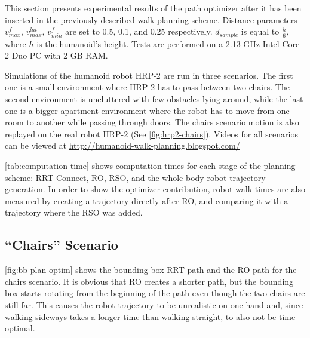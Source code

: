 \noindent This section presents experimental results of the path
optimizer after it has been inserted in the previously described walk
planning scheme. Distance parameters $v_{max}^f$,
$v_{max}^{lat}$, $v_{min}^f$ are set to 0.5, 0.1, and 0.25
respectively. $d_{sample}$ is equal to $\frac{h}{6}$, where $h$
is the humanoid's height.  Tests are performed on a 2.13 GHz Intel Core
2 Duo PC with 2 GB RAM.

Simulations of the humanoid robot HRP-2 are run in three scenarios.
The first one is a small environment where HRP-2 has to pass between
two chairs. The second environment is uncluttered with few obstacles
lying around, while the last one is a bigger apartment environment
where the robot has to move from one room to another while passing
through doors. The chairs scenario motion is also replayed on the real
robot HRP-2 (See \autoref{fig:hrp2-chairs}). Videos for all scenarios
can be viewed at \url{http://humanoid-walk-planning.blogspot.com/}

\autoref{tab:computation-time} shows computation times for each stage
of the planning scheme: RRT-Connect, RO, RSO, and the whole-body robot
trajectory generation. In order to show the optimizer contribution,
robot walk times are also measured by creating a trajectory directly
after RO, and comparing it with a trajectory where the RSO was added.

\subsection{``Chairs'' Scenario}
\noindent \autoref{fig:bb-plan-optim} shows the bounding box RRT path
and the RO path for the chairs scenario. It is obvious that RO creates
a shorter path, but the bounding box starts rotating from the
beginning of the path even though the two chairs are still far. This
causes the robot trajectory to be unrealistic on one hand and, since
walking sideways takes a longer time than walking straight, to also
not be time-optimal.

